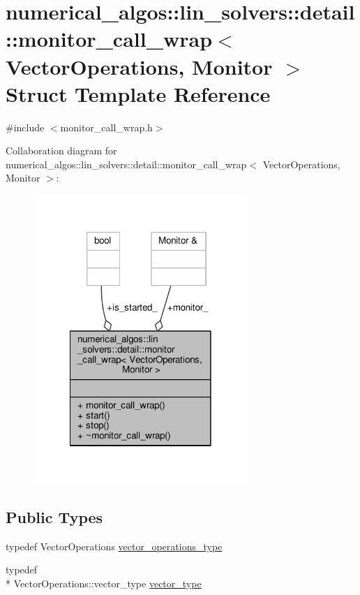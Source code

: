 \hypertarget{structnumerical__algos_1_1lin__solvers_1_1detail_1_1monitor__call__wrap}{\section{numerical\-\_\-algos\-:\-:lin\-\_\-solvers\-:\-:detail\-:\-:monitor\-\_\-call\-\_\-wrap$<$ Vector\-Operations, Monitor $>$ Struct Template Reference}
\label{structnumerical__algos_1_1lin__solvers_1_1detail_1_1monitor__call__wrap}
}


{\ttfamily \#include $<$monitor\-\_\-call\-\_\-wrap.\-h$>$}



Collaboration diagram for numerical\-\_\-algos\-:\-:lin\-\_\-solvers\-:\-:detail\-:\-:monitor\-\_\-call\-\_\-wrap$<$ Vector\-Operations, Monitor $>$\-:\nopagebreak
\begin{figure}[H]
\begin{center}
\leavevmode
\includegraphics[width=230pt]{structnumerical__algos_1_1lin__solvers_1_1detail_1_1monitor__call__wrap__coll__graph}
\end{center}
\end{figure}
\subsection*{Public Types}
\begin{DoxyCompactItemize}
\item 
typedef Vector\-Operations \hyperlink{structnumerical__algos_1_1lin__solvers_1_1detail_1_1monitor__call__wrap_aa04de6689ce29ef879768e365695a054}{vector\-\_\-operations\-\_\-type}
\item 
typedef \\*
Vector\-Operations\-::vector\-\_\-type \hyperlink{structnumerical__algos_1_1lin__solvers_1_1detail_1_1monitor__call__wrap_a7fc0dd90e41eee6b70e65ac9b4fb5131}{vector\-\_\-type}
\end{DoxyCompactItemize}
